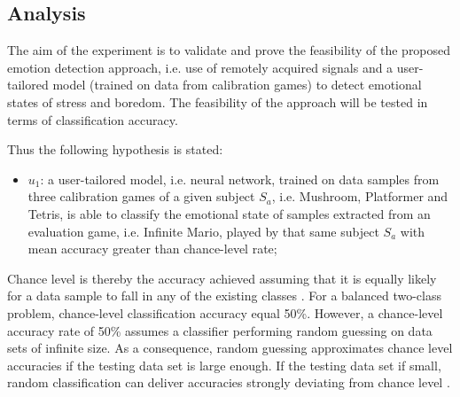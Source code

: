 \subsection{Analysis}

The aim of the experiment is to validate and prove the feasibility of the proposed emotion detection approach, i.e. use of remotely acquired signals and a user-tailored model (trained on data from calibration games) to detect emotional states of stress and boredom. The feasibility of the approach will be tested in terms of classification accuracy.

Thus the following hypothesis is stated:

\begin{itemize}
  \item $u_1$: a user-tailored model, i.e. neural network, trained on data samples from three calibration games of a given subject $S_a$, i.e. Mushroom, Platformer and Tetris, is able to classify the emotional state of samples extracted from an evaluation game, i.e. Infinite Mario, played by that same subject $S_a$ with mean accuracy greater than chance-level rate;
\end{itemize}

Chance level is thereby the accuracy achieved assuming that it is equally likely for a data sample to fall in any of the existing classes \parencite{kassraian2016promises}. For a balanced two-class problem, chance-level classification accuracy equal 50\%. However, a chance-level accuracy rate of 50\% assumes a classifier performing random guessing on data sets of infinite size. As a consequence, random guessing approximates chance level accuracies if the testing data set is large enough. If the testing data set if small, random classification can deliver accuracies strongly deviating from chance level \parencite{combrisson2015exceeding}.

